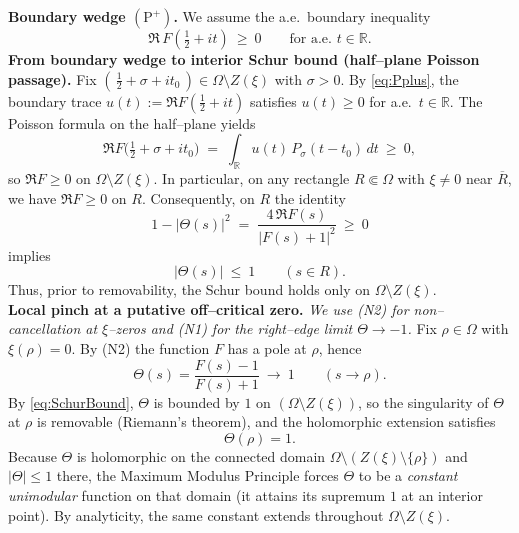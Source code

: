 \documentclass[11pt]{article}
\theoremstyle{definition}
\theoremstyle{remark}
\begin{document}
\noindent\textbf{Boundary wedge $(\mathrm{P}^+)$.}
We assume the a.e.\ boundary inequality
\[
\Re\,F\!\left(\tfrac12+it\right)\ \ge\ 0\qquad\text{for a.e.\ }t\in\mathbb R.
\tag{P+}
\label{eq:Pplus}
\]
\medskip
\noindent\textbf{From boundary wedge to interior Schur bound (half--plane Poisson passage).}
Fix $(\,\tfrac12+\sigma+it_0\,)\in\Omega\setminus Z(\xi)$ with $\sigma>0$.
By \eqref{eq:Pplus}, the boundary trace $u(t):=\Re F(\tfrac12+it)$ satisfies $u(t)\ge 0$ for a.e.\ $t\in\mathbb R$.
The Poisson formula on the half--plane yields
\[
\Re F\big(\tfrac12+\sigma+it_0\big)
\;=\;\int_{\mathbb R} u(t)\,P_\sigma(t-t_0)\,dt\ \ge\ 0,
\]
so $\Re F\ge 0$ on $\Omega\setminus Z(\xi)$.
In particular, on any rectangle $R\Subset\Omega$ with $\xi\neq 0$ near $\overline R$, we have $\Re F\ge 0$ on $R$.
Consequently, on $R$ the identity
\[
1-|\Theta(s)|^2\;=\;\frac{4\,\Re F(s)}{|F(s)+1|^2}\ \ge\ 0
\]
implies
\[
|\Theta(s)|\ \le\ 1\qquad(s\in R).
\tag{Schur}
\label{eq:SchurBound}
\]
\noindent Thus, prior to removability, the Schur bound holds only on $\Omega\setminus Z(\xi)$.
\medskip
\medskip \\
\noindent\textbf{Local pinch at a putative off--critical zero.}
\emph{We use (N2) for non--cancellation at $\xi$--zeros and (N1) for the right--edge limit $\Theta\to-1$.}
Fix $\rho\in\Omega$ with $\xi(\rho)=0$.
By (N2) the function $F$ has a pole at $\rho$, hence
\[
\Theta(s)=\frac{F(s)-1}{F(s)+1}\ \longrightarrow\ 1\qquad(s\to\rho).
\]
By \eqref{eq:SchurBound}, $\Theta$ is bounded by $1$ on $(\Omega\setminus Z(\xi))$,
so the singularity of $\Theta$ at $\rho$ is removable (Riemann's theorem), and the holomorphic extension satisfies
\[
\Theta(\rho)=1.
\]
Because $\Theta$ is holomorphic on the connected domain $\Omega\setminus(Z(\xi)\setminus\{\rho\})$
and $|\Theta|\le1$ there, the Maximum Modulus Principle forces $\Theta$ to be
a \emph{constant unimodular} function on that domain (it attains its supremum $1$ at an interior point).
By analyticity, the same constant extends throughout $\Omega\setminus Z(\xi)$.
\medskip
\end{document}
